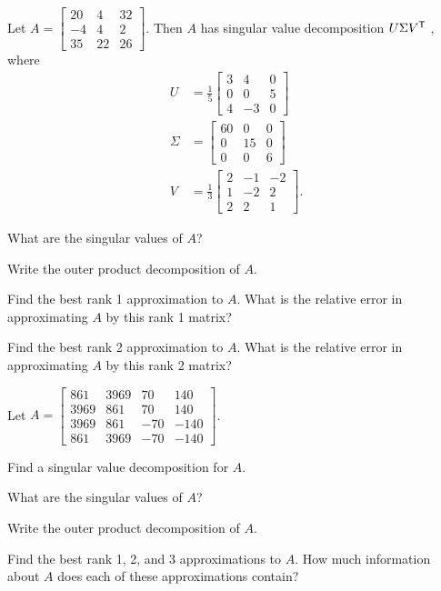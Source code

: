 \label{sec:pseudo_exer}
\be
\item Let $A = \left[ \begin{array}{rcc} 20&4&32 \\ -4&4&2 \\ 35&22&26 \end{array} \right]$. Then $A$ has singular value decomposition $U \Sigma V^{\mathsf{T}}$ , where 
\begin{align*}
U &= \frac{1}{5}\left[ \begin{array}{crc} 3&4&0 \\ 0&0&5 \\ 4&-3&0 \end{array} \right] \\
\Sigma &= \left[ \begin{array}{crc} 60&0&0 \\ 0&15&0 \\ 0&0&6 \end{array} \right] \\
V &= \frac{1}{3}\left[ \begin{array}{crr} 2&-1&-2 \\ 1&-2&2 \\ 2&2&1 \end{array} \right].
\end{align*}
	\ba
	\item What are the singular values of $A$?
	\item Write the outer product decomposition of $A$. 
	\item Find the best rank 1 approximation to $A$. What is the relative error in approximating $A$ by this rank 1 matrix? 
	\item Find the best rank 2 approximation to $A$. What is the relative error in approximating $A$ by this rank 2 matrix?
	\ea

\item Let $A = \left[ \begin{array}{ccrr} 861&3969&70&140 \\ 3969&861&70&140 \\ 3969&861&-70&-140 \\ 861&3969&-70&-140 \end{array} \right]$. 
	\ba
	\item Find a singular value decomposition for $A$. 
	\item What are the singular values of $A$?
	\item Write the outer product decomposition of $A$. 
	\item Find the best rank 1, 2, and 3 approximations to $A$. How much information about $A$ does each of these approximations contain?
	\ea
	
